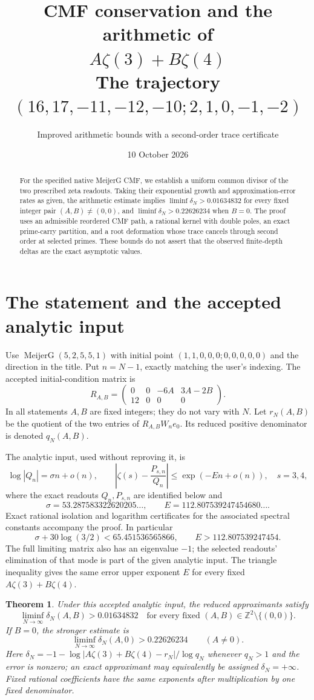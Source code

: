 \documentclass[11pt]{article}
\title{CMF conservation and the arithmetic of\\$A\zeta(3)+B\zeta(4)$\\\large The trajectory $(16,17,-11,-12,-10;2,1,0,-1,-2)$}
\author{Improved arithmetic bounds with a second-order trace certificate}
\date{10 October 2026}
\newtheorem{theorem}{Theorem}
\newcommand{\Z}{\mathbb Z}
\begin{document}
\maketitle
\begin{abstract}
For the specified native MeijerG CMF, we establish a uniform common
divisor of the two prescribed zeta readouts. Taking their exponential
growth and approximation-error rates as given, the arithmetic estimate
implies $\liminf\delta_N>0.01634832$ for every fixed integer pair
$(A,B)\ne(0,0)$, and $\liminf\delta_N>0.22626234$ when $B=0$.
The proof uses an admissible reordered CMF path, a rational kernel with
double poles, an exact prime-carry partition, and a root deformation
whose trace cancels through second order at selected primes. These bounds do not assert
that the observed finite-depth deltas are the exact asymptotic values.
\end{abstract}

\section{The statement and the accepted analytic input}
Use $\operatorname{MeijerG}(5,2,5,5,1)$ with initial point
$(1,1,0,0,0;0,0,0,0,0)$ and the direction in the title. Put $n=N-1$,
exactly matching the user's indexing. The accepted initial-condition
matrix is
\[
 R_{A,B}=\begin{pmatrix}0&0&-6A&3A-2B\\12&0&0&0\end{pmatrix}.
\]
In all statements $A,B$ are fixed integers; they do not vary with $N$.
Let $r_N(A,B)$ be the quotient of the two entries of $R_{A,B}W_ne_0$.
Its reduced positive denominator is denoted $q_N(A,B)$.

The analytic input, used without reproving it, is
\[
 \log|Q_n|=\sigma n+o(n),\qquad
 \left|\zeta(s)-\frac{P_{s,n}}{Q_n}\right|
       \le \exp(-En+o(n)),\quad s=3,4,
\]
where the exact readouts $Q_n,P_{s,n}$ are identified below and
\[
 \sigma=53.287583322620205\ldots,\qquad
 E=112.807539247454680\ldots .
\]
Exact rational isolation and logarithm certificates for the associated
spectral constants accompany the proof. In particular
\[
 \sigma+30\log(3/2)<65.451536565866,\qquad E>112.807539247454.
\]
The full limiting matrix also has an eigenvalue $-1$; the selected
readouts' elimination of that mode is part of the given analytic input.
The triangle inequality gives the same error upper exponent $E$ for
every fixed $A\zeta(3)+B\zeta(4)$.

\begin{theorem}
Under this accepted analytic input, the reduced approximants satisfy
\[
 \boxed{\liminf_{N\to\infty}\delta_N(A,B)>0.01634832}
 \quad\text{for every fixed }(A,B)\in\Z^2\setminus\{(0,0)\}.
\]
If $B=0$, the stronger estimate is
\[
 \boxed{\liminf_{N\to\infty}\delta_N(A,0)>0.22626234}\qquad(A\ne0).
\]
Here $\delta_N=-1-\log|A\zeta(3)+B\zeta(4)-r_N|/\log q_N$ whenever
$q_N>1$ and the error is nonzero; an exact approximant may equivalently
be assigned $\delta_N=+\infty$. Fixed rational coefficients have the same
exponents after multiplication by one fixed denominator.
\end{theorem}
\end{document}
